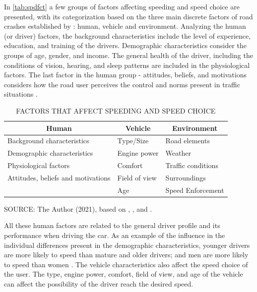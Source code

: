 In \autoref{tab:spdfct} a few groups of factors affecting speeding and speed choice are presented, with its categorization based on the three main discrete factors of road crashes established by \textcite{Haddon1980}: human, vehicle and environment. Analyzing the human (or driver) factors, the background characteristics include the level of experience, education, and training of the drivers. Demographic characteristics consider the groups of age, gender, and income. The general health of the driver, including the conditions of vision, hearing, and sleep patterns are included in the physiological factors. The last factor in the human group - attitudes, beliefs, and motivations considers how the road user perceives the control and norms present in traffic situations \cite{Richard2013a}.  

\begin{table}[!hbtp]
    \footnotesize
    \captionsetup{justification=raggedright,
        singlelinecheck=false,
        font=footnotesize}
    \caption{FACTORS THAT AFFECT SPEEDING AND SPEED CHOICE}
    \centering
    \begin{tabular}{lll}
    \hline
    \multicolumn{1}{c}{\textbf{Human}}                  & \multicolumn{1}{c}{\textbf{Vehicle}} & \multicolumn{1}{c}{\textbf{Environment}} \\ \hline
    Background characteristics      & Type/Size        & Road elements        \\
    Demographic characteristics     & Engine power     & Weather              \\
    Physiological factors           & Comfort          & Traffic conditions   \\
    Attitudes, beliefs and motivations & Field of view    & Surroundings    \\
                                    & Age              & Speed Enforcement    \\ \hline
\end{tabular}
    \label{tab:spdfct}
    \par \vspace{2mm} \footnotesize \raggedright
    SOURCE: The Author (2021), based on \textcite{Richard2013a}, \textcite{Shinar2017}, and \textcite{WHO2008}.
\end{table}

All these human factors are related to the general driver profile and its performance when driving the car. As an example of the influence in the individual differences present in the demographic characteristics, younger drivers are more likely to speed than mature and older drivers; and men are more likely to speed than women \cite{Shinar2017}. The vehicle characteristics also affect the speed choice of the user. The type, engine power, comfort, field of view, and age of the vehicle can affect the possibility of the driver reach the desired speed. 

